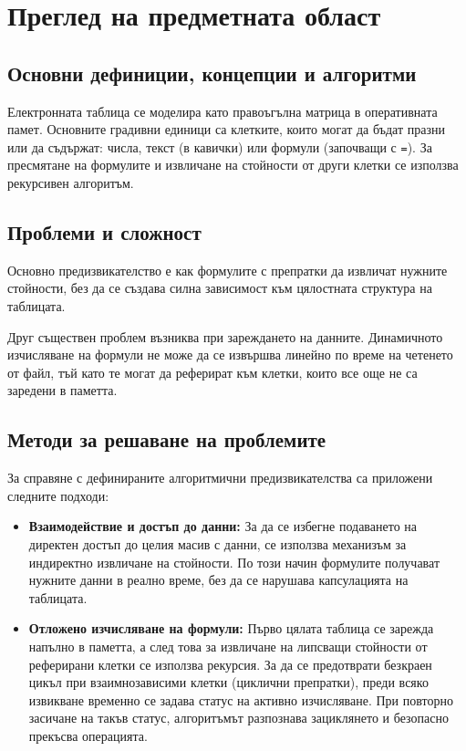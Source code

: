 \chapter{Преглед на предметната област}

\section{Основни дефиниции, концепции и алгоритми}
Електронната таблица се моделира като правоъгълна матрица в оперативната памет. Основните градивни единици са клетките, които могат да бъдат празни или да съдържат: числа, текст (в кавички) или формули (започващи с \texttt{=}). За пресмятане на формулите и извличане на стойности от други клетки се използва рекурсивен алгоритъм.

\section{Проблеми и сложност}
Основно предизвикателство е как формулите с препратки да извличат нужните стойности, без да се създава силна зависимост към цялостната структура на таблицата.

Друг съществен проблем възниква при зареждането на данните. Динамичното изчисляване на формули не може да се извършва линейно по време на четенето от файл, тъй като те могат да реферират към клетки, които все още не са заредени в паметта.

\section{Методи за решаване на проблемите}
За справяне с дефинираните алгоритмични предизвикателства са приложени следните подходи:

\begin{itemize}
  \item \textbf{Взаимодействие и достъп до данни:} За да се избегне подаването на директен достъп до целия масив с данни, се използва механизъм за индиректно извличане на стойности. По този начин формулите получават нужните данни в реално време, без да се нарушава капсулацията на таблицата.

  \item \textbf{Отложено изчисляване на формули:} Първо цялата таблица се зарежда напълно в паметта, а след това за извличане на липсващи стойности от реферирани клетки се използва рекурсия. За да се предотврати безкраен цикъл при взаимнозависими клетки (циклични препратки), преди всяко извикване временно се задава статус на активно изчисляване. При повторно засичане на такъв статус, алгоритъмът разпознава зациклянето и безопасно прекъсва операцията.
\end{itemize}

